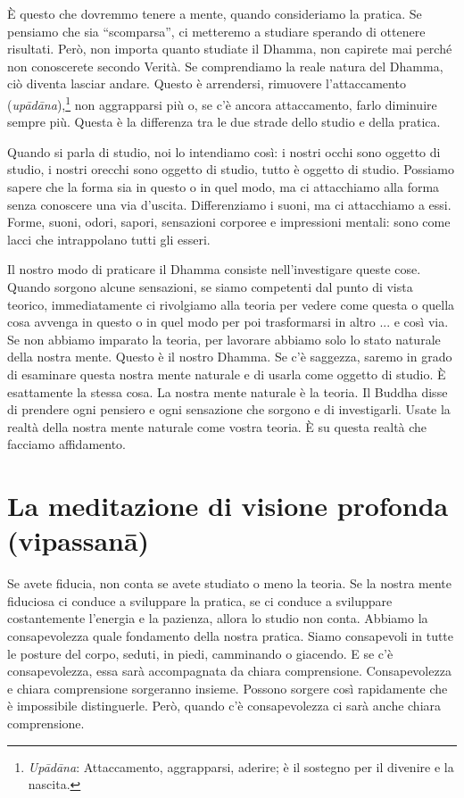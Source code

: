 È questo che dovremmo tenere a mente, quando consideriamo la pratica. Se
pensiamo che sia ``scomparsa'', ci metteremo a studiare sperando di
ottenere risultati. Però, non importa quanto studiate il Dhamma, non
capirete mai perché non conoscerete secondo Verità. Se comprendiamo la
reale natura del Dhamma, ciò diventa lasciar andare. Questo è
arrendersi, rimuovere l'attaccamento (\emph{upādāna}),\footnote{\emph{Upādāna}:
  Attaccamento, aggrapparsi, aderire; è il sostegno per il divenire e la
  nascita.} non aggrapparsi più o, se c'è ancora attaccamento, farlo
diminuire sempre più. Questa è la differenza tra le due strade dello
studio e della pratica.

Quando si parla di studio, noi lo intendiamo così: i nostri occhi sono
oggetto di studio, i nostri orecchi sono oggetto di studio, tutto è
oggetto di studio. Possiamo sapere che la forma sia in questo o in quel
modo, ma ci attacchiamo alla forma senza conoscere una via d'uscita.
Differenziamo i suoni, ma ci attacchiamo a essi. Forme, suoni, odori,
sapori, sensazioni corporee e impressioni mentali: sono come lacci che
intrappolano tutti gli esseri.

Il nostro modo di praticare il Dhamma consiste nell'investigare queste
cose. Quando sorgono alcune sensazioni, se siamo competenti dal punto di
vista teorico, immediatamente ci rivolgiamo alla teoria per vedere come
questa o quella cosa avvenga in questo o in quel modo per poi
trasformarsi in altro ... e così via. Se non abbiamo imparato la teoria,
per lavorare abbiamo solo lo stato naturale della nostra mente. Questo è
il nostro Dhamma. Se c'è saggezza, saremo in grado di esaminare questa
nostra mente naturale e di usarla come oggetto di studio. È esattamente
la stessa cosa. La nostra mente naturale è la teoria. Il Buddha disse di
prendere ogni pensiero e ogni sensazione che sorgono e di investigarli.
Usate la realtà della nostra mente naturale come vostra teoria. È su
questa realtà che facciamo affidamento.

\section{La meditazione di visione profonda (vipassanā)}


Se avete fiducia, non conta se avete studiato o meno la teoria. Se la
nostra mente fiduciosa ci conduce a sviluppare la pratica, se ci conduce
a sviluppare costantemente l'energia e la pazienza, allora lo studio non
conta. Abbiamo la consapevolezza quale fondamento della nostra pratica.
Siamo consapevoli in tutte le posture del corpo, seduti, in piedi,
camminando o giacendo. E se c'è consapevolezza, essa sarà accompagnata
da chiara comprensione. Consapevolezza e chiara comprensione sorgeranno
insieme. Possono sorgere così rapidamente che è impossibile
distinguerle. Però, quando c'è consapevolezza ci sarà anche chiara
comprensione.

